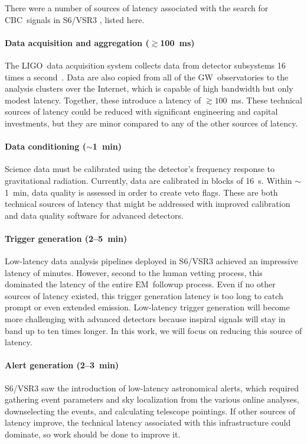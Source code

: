 \documentclass[preprint2]{aastex}
\newcommand{\GW}{GW}%
\newcommand{\EM}{EM}%
\newcommand{\CBC}{CBC}%
\newcommand{\LIGO}{LIGO}%
\begin{document}
There were a number of sources of latency associated with the search for
\CBC\ signals in S6/VSR3 \citep{HugheyGWPAW2011}, listed here.

\paragraph{Data acquisition and aggregation ($\gtrsim$100~ms)}%
The \LIGO\ data acquisition system collects data from detector subsystems 16
times a second~\citep{Bork2001}. Data are also copied from all of the \GW\
observatories to the analysis clusters over the Internet, which is capable of
high bandwidth but only modest latency.  Together, these introduce a latency of
$\gtrsim$$100$~ms.  These technical sources of latency could be reduced with
significant engineering and capital investments, but they are minor compared
to any of the other sources of latency.

\paragraph{Data conditioning ($\sim$1~min)}%
Science data must be calibrated using the detector's frequency response to
gravitational radiation.  Currently, data are calibrated in blocks of 16~s.
Within $\sim$1~min, data quality is assessed in order to create veto flags.
These are both technical sources of latency that might be addressed with
improved calibration and data quality software for advanced detectors.

\paragraph{Trigger generation (2--5~min)}%
Low-latency data analysis pipelines
deployed in S6/VSR3 achieved an impressive latency of minutes.  However, second
to the human vetting process, this dominated the latency of the entire \EM\
followup process.  Even if no other sources of latency existed, this trigger
generation latency is too long to catch prompt or even extended emission.
Low-latency trigger generation will become more challenging with advanced
detectors because inspiral signals will stay in band up to ten times longer.  In
this work, we will focus on reducing this source of latency.

\paragraph{Alert generation (2--3~min)}%
S6/VSR3 saw the introduction of low-latency astronomical alerts, which required
gathering event parameters and sky localization from the various online
analyses, downselecting the events, and calculating telescope pointings.  If
other sources of latency improve, the technical latency associated with this
infrastructure could dominate, so work should be done to improve it.
\end{document}
